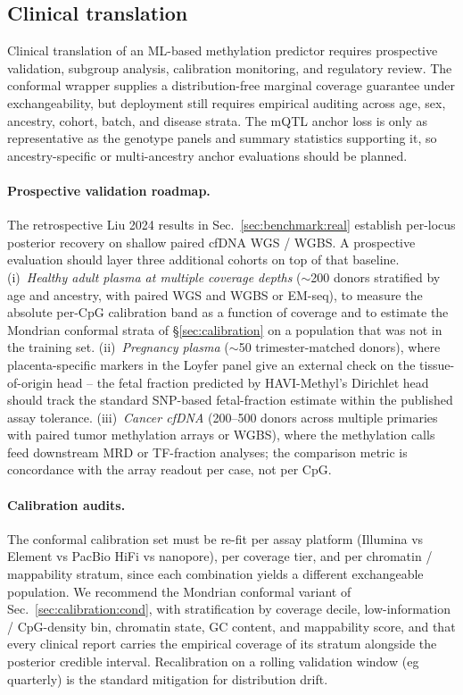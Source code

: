 \subsection{Clinical translation}
Clinical translation of an ML-based methylation predictor requires prospective validation, subgroup analysis, calibration monitoring, and regulatory review. The conformal wrapper supplies a distribution-free marginal coverage guarantee under exchangeability, but deployment still requires empirical auditing across age, sex, ancestry, cohort, batch, and disease strata. The mQTL anchor loss is only as representative as the genotype panels and summary statistics supporting it, so ancestry-specific or multi-ancestry anchor evaluations should be planned.

\paragraph{Prospective validation roadmap.} The retrospective Liu 2024 results in Sec.~\ref{sec:benchmark:real} establish per-locus posterior recovery on shallow paired cfDNA WGS / WGBS. A prospective evaluation should layer three additional cohorts on top of that baseline. (i)~\emph{Healthy adult plasma at multiple coverage depths} ($\sim$200 donors stratified by age and ancestry, with paired WGS and WGBS or EM-seq), to measure the absolute per-CpG calibration band as a function of coverage and to estimate the Mondrian conformal strata of \S\ref{sec:calibration} on a population that was not in the training set. (ii)~\emph{Pregnancy plasma} ($\sim$50 trimester-matched donors), where placenta-specific markers in the Loyfer panel give an external check on the tissue-of-origin head -- the fetal fraction predicted by HAVI-Methyl's Dirichlet head should track the standard SNP-based fetal-fraction estimate within the published assay tolerance. (iii)~\emph{Cancer cfDNA} (200--500 donors across multiple primaries with paired tumor methylation arrays or WGBS), where the methylation calls feed downstream MRD or TF-fraction analyses; the comparison metric is concordance with the array readout per case, not per CpG.

\paragraph{Calibration audits.} The conformal calibration set must be re-fit per assay platform (Illumina vs Element vs PacBio HiFi vs nanopore), per coverage tier, and per chromatin / mappability stratum, since each combination yields a different exchangeable population. We recommend the Mondrian conformal variant of Sec.~\ref{sec:calibration:cond}, with stratification by coverage decile, low-information / CpG-density bin, chromatin state, GC content, and mappability score, and that every clinical report carries the empirical coverage of its stratum alongside the posterior credible interval. Recalibration on a rolling validation window (eg quarterly) is the standard mitigation for distribution drift.

